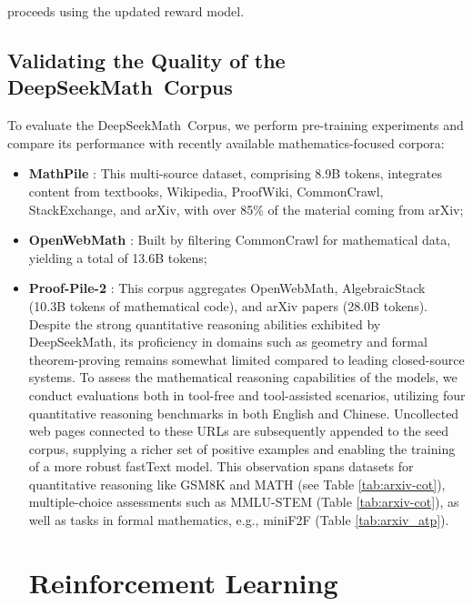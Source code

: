 \begin{itemize}[topsep=0pt]
\begin{itemize}[topsep=0pt]
proceeds using the updated reward model. \subsection{Validating the Quality of the DeepSeekMath~Corpus}

To evaluate the DeepSeekMath~Corpus, we perform pre-training experiments and compare its performance with recently available mathematics-focused corpora:

\begin{itemize}[topsep=0pt]
    \item \textbf{MathPile} \citep{mathpile}: This multi-source dataset, comprising 8.9B tokens, integrates content from textbooks, Wikipedia, ProofWiki, CommonCrawl, StackExchange, and arXiv, with over 85\% of the material coming from arXiv;
    \item \textbf{OpenWebMath} \citep{openwebmath}: Built by filtering CommonCrawl for mathematical data, yielding a total of 13.6B tokens;
    \item \textbf{Proof-Pile-2} \citep{llemma}: This corpus aggregates OpenWebMath, AlgebraicStack (10.3B tokens of mathematical code), and arXiv papers (28.0B tokens). Despite the strong quantitative reasoning abilities exhibited by DeepSeekMath, its proficiency in domains such as geometry and formal theorem-proving remains somewhat limited compared to leading closed-source systems. To assess the mathematical reasoning capabilities of the models, we conduct evaluations both in tool-free and tool-assisted scenarios, utilizing four quantitative reasoning benchmarks in both English and Chinese. Uncollected web pages connected to these URLs are subsequently appended to the seed corpus, supplying a richer set of positive examples and enabling the training of a more robust fastText model. This observation spans datasets for quantitative reasoning like GSM8K and MATH (see Table \ref{tab:arxiv-cot}), multiple-choice assessments such as MMLU-STEM (Table \ref{tab:arxiv-cot}), as well as tasks in formal mathematics, e.g., miniF2F (Table \ref{tab:arxiv_atp}). \section{Reinforcement Learning}


\end{itemize}
\end{itemize}
\end{itemize}

